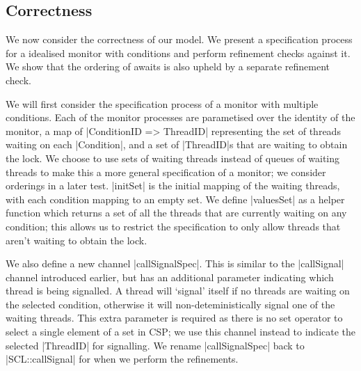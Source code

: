 \subsection{Correctness}

We now consider the correctness of our model. We present a specification process for a idealised monitor with conditions and perform refinement checks against it. We show that the ordering of awaits is also upheld by a separate  refinement check.
  
  We will first consider the specification process of a monitor with multiple conditions. Each of the monitor processes are parametised over the identity of the monitor, a map of |ConditionID => {ThreadID}| representing the set of threads waiting on each |Condition|, and a set of |ThreadID|s that are waiting to obtain the lock. We choose to use sets of waiting threads instead of queues of waiting threads to make this a more general specification of a monitor; we consider orderings in a later test. |initSet| is the initial mapping of the waiting threads, with each condition mapping to an empty set. We define |valuesSet| as a helper function which returns a set of all the threads that are currently waiting on any condition; this allows us to restrict the specification to only allow threads that aren't waiting to obtain the lock. 
  
  We also define a new channel |callSignalSpec|. This is similar to the |callSignal| channel introduced earlier, but has an additional parameter indicating which thread is being signalled. A thread will `signal' itself if no threads are waiting on the selected condition, otherwise it will non-deteministically signal one of the waiting threads. This extra parameter is required as there is no set operator to select a single element of a set in CSP; we use this channel instead to indicate the selected |ThreadID| for signalling. We rename |callSignalSpec| back to |SCL::callSignal| for when we perform the refinements.

